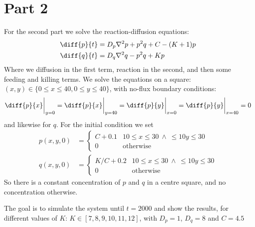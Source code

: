 \documentclass[a4paper,10pt]{article}
\begin{document}
	\section*{Part 2}
	For the second part we solve the reaction-diffusion equations:
	\begin{align}
		\diff{p}{t} &= D_p \nabla^2 p + p^2q+C-(K+1)p \\
		\diff{q}{t} &= D_q \nabla^2 q - p^2q+Kp
	\end{align}
	Where we diffusion in the first term, reaction in the second, and then some feeding and killing terms. We solve the equations on a square: $(x,y) \in \{0\leq x \leq 40, 0\leq y\leq 40\} $, with no-flux boundary conditions:
	\begin{equation}\label{key}
		\diff{p}{x}\bigg|_{y=0} = \diff{p}{x}\bigg|_{y=40} = \diff{p}{y}\bigg|_{x=0} = \diff{p}{y}\bigg|_{x=40} = 0
	\end{equation}
	and likewise for $ q $. For the initial condition we set
	\begin{align}\label{key}
		p(x,y,0) &= \begin{cases}
		C+0.1 & 10 \leq x \leq 30\  \wedge \ \leq 10 y \leq 30 \\
		0 & \text{otherwise}
		\end{cases} \\
		q(x,y,0) &= \begin{cases}
		K/C+0.2 & 10 \leq x \leq 30\  \wedge \ \leq 10 y \leq 30 \\
		0 & \text{otherwise}
		\end{cases}
	\end{align}
	So there is a constant concentration of $ p $ and $ q $ in a centre square, and no concentration otherwise.
	
	The goal is to simulate the system until $ t=2000 $ and show the results, for different values of $ K $: $ K \in [7,8,9,10,11,12] $, with $ D_p = 1 $, $ D_q=8 $ and $ C=4.5 $
	
\end{document}
